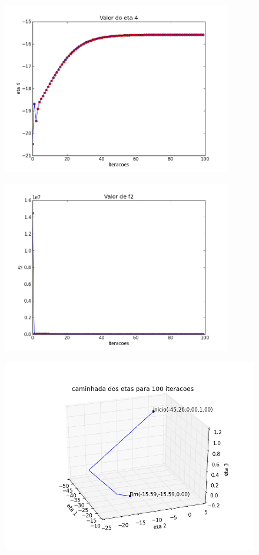 \documentclass[12pt]{article}
\begin{document}
\begin{figure}[!h]
\begin{center}
\includegraphics[width=10cm]{20_20_eta_4.png}
\end{center}
\end{figure}

\begin{figure}[!h]
\begin{center}
\includegraphics[width=10cm]{20_20_f_2.png}
\end{center}
\end{figure}

\begin{figure}[!h]
\begin{center}
\includegraphics[width=12cm]{20_20_caminhada.png}
\end{center}
\end{figure}
\end{document}
